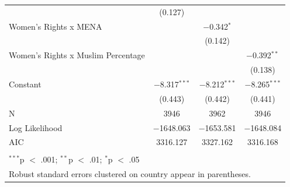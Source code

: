 \documentclass[11pt, oneside]{article}
\begin{document}
\begin{table}[!htbp]
\begin{tabular}{@{\extracolsep{5pt}}lccc}
  & (0.127) &  &  \\ 
  Women's Rights x MENA &  & $-$0.342$^{*}$ &  \\ 
  &  & (0.142) &  \\ 
  Women's Rights x Muslim Percentage &  &  & $-$0.392$^{**}$ \\ 
  &  &  & (0.138) \\ 
  Constant & $-$8.317$^{***}$ & $-$8.212$^{***}$ & $-$8.265$^{***}$ \\ 
  & (0.443) & (0.442) & (0.441) \\ 
 N & 3946 & 3962 & 3946 \\ 
Log Likelihood & $-$1648.063 & $-$1653.581 & $-$1648.084 \\ 
AIC & 3316.127 & 3327.162 & 3316.168 \\ 
\hline \\[-1.8ex] 
\multicolumn{4}{l}{$^{***}$p $<$ .001; $^{**}$p $<$ .01; $^{*}$p $<$ .05} \\ 
\multicolumn{4}{l}{Robust standard errors clustered on country appear in parentheses.} \\ 
\end{tabular} 
\end{table} 
\end{document}
